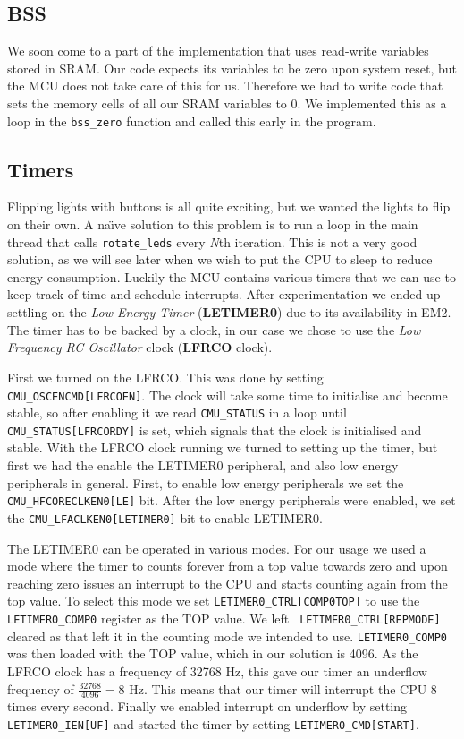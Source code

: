 \subsection{BSS}

We soon come to a part of the implementation that uses read-write variables
stored in SRAM. Our code expects its variables to be zero upon system reset, but
the MCU does not take care of this for us. Therefore we had to write code that
sets the memory cells of all our SRAM variables to 0. We implemented this as a
loop in the {\tt bss\_zero} function and called this early in the program.

\subsection{Timers}

Flipping lights with buttons is all quite exciting, but we wanted the lights to
flip on their own. A na\"{\i}ve solution to this problem is to run a loop in the
main thread that calls {\tt rotate\_leds} every \textit{N}th iteration. This is
not a very good solution, as we will see later when we wish to put the CPU to
sleep to reduce energy consumption. Luckily the MCU contains various timers that
we can use to keep track of time and schedule interrupts. After experimentation
we ended up settling on the \emph{Low Energy Timer} (\textbf{LETIMER0}) due to
its availability in EM2. The timer has to be backed by a clock, in our case we
chose to use the \emph{Low Frequency RC Oscillator} clock (\textbf{LFRCO}
clock).

First we turned on the LFRCO. This was done by setting {\tt
CMU\_OSCENCMD[LFRCOEN]}. The clock will take some time to initialise and become
stable, so after enabling it we read {\tt CMU\_STATUS} in a loop until {\tt
CMU\_STATUS[LFRCORDY]} is set, which signals that the clock is initialised and
stable. With the LFRCO clock running we turned to setting up the timer, but
first we had the enable the LETIMER0 peripheral, and also low energy peripherals
in general. First, to enable low energy peripherals we set the {\tt
CMU\_HFCORECLKEN0[LE]} bit. After the low energy peripherals were enabled, we
set the {\tt CMU\_LFACLKEN0[LETIMER0]} bit to enable LETIMER0.

The LETIMER0 can be operated in various modes. For our usage we used a mode
where the timer to counts forever from a top value towards zero and upon
reaching zero issues an interrupt to the CPU and starts counting again from the
top value. To select this mode we set {\tt LETIMER0\_CTRL[COMP0TOP]} to use the
{\tt LETIMER0\_COMP0} register as the TOP value. We left {\tt
LETIMER0\_CTRL[REPMODE]} cleared as that left it in the counting mode we
intended to use. {\tt LETIMER0\_COMP0} was then loaded with the TOP value, which
in our solution is 4096. As the LFRCO clock has a frequency of 32768 Hz, this
gave our timer an underflow frequency of \( \frac{32768}{4096} = 8 \) Hz. This
means that our timer will interrupt the CPU 8 times every second. Finally we
enabled interrupt on underflow by setting {\tt LETIMER0\_IEN[UF]} and started
the timer by setting {\tt LETIMER0\_CMD[START]}.


